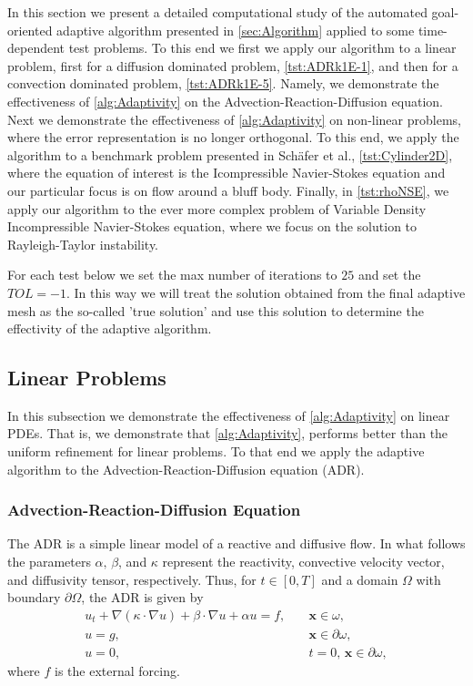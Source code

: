 In this section we present a detailed computational study of the automated
goal-oriented adaptive algorithm presented in \autoref{sec:Algorithm} applied to
some time-dependent test problems. To this end we first we apply our algorithm
to a linear problem, first for a diffusion dominated problem,
\autoref{tst:ADRk1E-1}, and then for a convection dominated problem,
\autoref{tst:ADRk1E-5}.  Namely, we demonstrate the effectiveness of
\autoref{alg:Adaptivity} on the Advection-Reaction-Diffusion equation. Next we
demonstrate the effectiveness of \autoref{alg:Adaptivity} on non-linear
problems, where the error representation is no longer orthogonal. To this end,
we apply the algorithm to a benchmark problem presented in Sch\"afer et
al.\cite{Schaefer1996}, \autoref{tst:Cylinder2D}, where the equation of interest
is the Icompressible Navier-Stokes equation and our particular focus is on flow
around a bluff body.  Finally, in \autoref{tst:rhoNSE}, we apply our algorithm
to the ever more complex problem of Variable Density Incompressible
Navier-Stokes equation, where we focus on the solution to Rayleigh-Taylor
instability.

For each test below we set the max number of iterations to $25$ and set the
$TOL=-1$. In this way we will treat the solution obtained from the final
adaptive mesh as the so-called 'true solution' and use this solution to
determine the effectivity of the adaptive algorithm.

\subsection{Linear Problems}
    In this subsection we demonstrate the effectiveness of
    \autoref{alg:Adaptivity} on linear PDEs. That is, we demonstrate that
    \autoref{alg:Adaptivity}, performs better than the uniform refinement for
    linear problems. To that end we apply the adaptive algorithm to
    the Advection-Reaction-Diffusion equation (ADR).

\subsubsection{Advection-Reaction-Diffusion Equation} \label{sss:ADR}
    The ADR is a simple linear model of a reactive and diffusive flow.  In what
    follows the parameters $\alpha,\,\beta$, and $\kappa$ represent the
    reactivity, convective velocity vector, and diffusivity tensor,
    respectively. Thus, for $t\in [0,T]$ and a domain $\Omega$ with boundary
    $\partial \Omega$, the ADR is given by
    \begin{equation}
        \begin{split}
            u_t + \nabla \left(\kappa\cdot \nabla u \right) + \beta \cdot \nabla
                u + \alpha u = f,& \quad \mathbf{x} \in \omega, \\
            u = g,& \quad \mathbf{x} \in \partial \omega, \\
            u = 0,& \quad t = 0,\, \mathbf{x} \in \partial \omega,
        \end{split}
        \label{eq:ADR}
    \end{equation}
    where $f$ is the external forcing.


